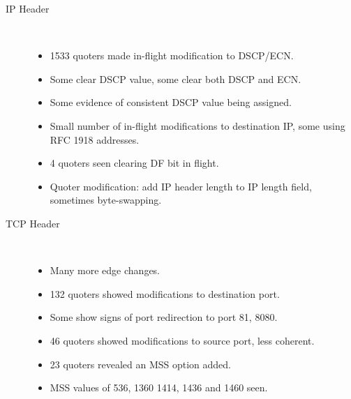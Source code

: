 \documentclass[portrait,a0b,final]{a0poster}
\newenvironment{poster}{
  \begin{center}
  \begin{minipage}[c]{0.98\textwidth}
}{
  \end{minipage} 
  \end{center}
}
\newenvironment{pcolumn}[1]{
  \begin{minipage}{#1\textwidth}
  \begin{center}
}{
  \end{center}
  \end{minipage}
}
\begin{document}
\begin{poster}
\begin{center}
\begin{pcolumn}{0.32}
{\begin{description}
\item[IP Header]\ \\[-1cm]
	\begin{itemize}
	\item 1533 quoters made in-flight modification to DSCP/ECN.
	\item Some clear DSCP value, some clear both DSCP and ECN.
	\item Some evidence of consistent DSCP value being assigned.
	\item Small number of in-flight modifications to destination
		IP, some using RFC 1918 addresses.
	\item 4 quoters seen clearing DF bit in flight.
	\item Quoter modification: add IP header
		length to IP length field, sometimes byte-swapping.
	\end{itemize}
\item[TCP Header]\ \\[-1cm]
	\begin{itemize}
	\item Many more edge changes.
	\item 132 quoters showed modifications to destination port.
	\item Some show signs of port redirection to port 81, 8080.
	\item 46 quoters showed modifications to source port, less coherent.
	\item 23 quoters revealed an MSS option added.
	\item MSS values of 536, 1360 1414, 1436 and 1460 seen.
	\end{itemize}
\end{description}

}
\end{pcolumn}
\end{center}

\end{poster}
\end{document}

